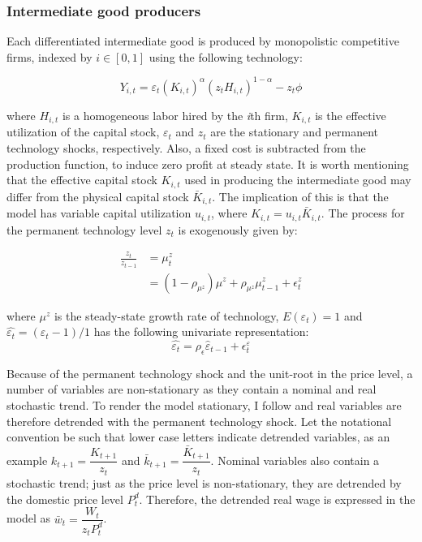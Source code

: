 \documentclass[12pt,oneside,a4paper]{article}
\begin{document}
\subsubsection{Intermediate good producers}
Each differentiated intermediate good is produced by monopolistic competitive firms, indexed by $i \in [0,1]$ using the following technology:

\begin{equation}
    Y_{i, t}=\varepsilon_{t}\left(K_{i, t}\right)^{\alpha}\left(z_{t} H_{i, t}\right)^{1-\alpha}-z_{t} \phi
\end{equation}

where $H_{i, t}$ is a homogeneous labor hired by the \textit{i}th firm, $K_{i, t}$ is the effective utilization of the capital stock, $\varepsilon_{t}$ and $z_{t}$ are the stationary and permanent technology shocks, respectively. Also, a fixed cost is subtracted from the production function, to induce zero profit at steady state. It is worth mentioning that the effective capital stock $K_{i, t}$ used in producing the intermediate good may differ from the physical capital stock $\bar{K}_{i, t}$. The implication of this is that the model has variable capital utilization $u_{i,t}$, where $K_{i, t} = u_{i,t} \bar{K}_{i, t}$. 
The process for the permanent technology level $z_t$ is exogenously given by:

\begin{equation}
    \begin{aligned}
        \frac{z_{t}}{z_{t-1}} &=\mu_{t}^{z} \\
        &=\left(1-\rho_{\mu^{z}}\right) \mu^{z}+\rho_{\mu^{z}} \mu_{t-1}^{z}+\epsilon_{t}^{z}
    \end{aligned}
\end{equation}

where $\mu^{z}$ is the steady-state growth rate of technology, $E(\varepsilon_{t}) =1$ and $\hat{\varepsilon_{t}} = (\varepsilon_{t} -1)/1$ has the following univariate representation:
\begin{equation}
    \hat{\varepsilon_{t}} = \rho_{\epsilon} \hat{\varepsilon}_{t-1} + \epsilon_{t}^{\varepsilon}
\end{equation}

Because of the permanent technology shock and the unit-root in the price level, a number of variables
are non-stationary as they contain a nominal and real stochastic trend. To render the model stationary, I follow \citet{Altig:2011} and real variables are therefore detrended with the permanent technology shock. Let the notational convention be such that lower case letters indicate detrended variables, as an example $k_{t+1} = \dfrac{K_{t+1}}{z_t}$ and $\bar{k}_{t+1} = \dfrac{\bar{K}_{t+1}}{z_t}$. Nominal variables also contain a stochastic trend; just as the price level is non-stationary, they are detrended by the domestic price level $P_t^{d}$. Therefore, the detrended real wage is expressed in the model as $\bar{w}_t = \dfrac{W_t}{z_t P_t^{d}}$.
\end{document}
